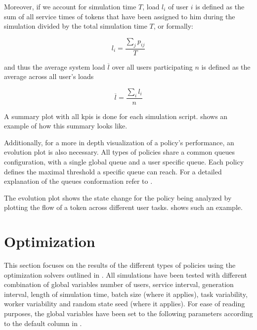 \documentclass{seal_thesis}
\begin{document}
Moreover, if we account for simulation time $T$, load $l_i$ of user $i$ is defined as the sum of all service times of tokens that have been assigned to him during the simulation divided by the total simulation time $T$, or formally:

\begin{equation}
	l_i=\frac{\sum_j p_{ij}}{T}
\end{equation}

and thus the average system load $\overline{l}$ over all users participating $n$ is defined as the average across all user's loads \ie

\begin{equation}
	\overline{l} = \frac{\sum_i l_i}{n}
\end{equation}

A summary plot with all \glspl{kpi} is done for each simulation script.  shows an example of how this summary looks like.


Additionally, for a more in depth visualization of a policy's performance, an evolution plot is also necessary. All types of policies share a common queues configuration, with a single global queue and a user specific queue. Each policy defines the maximal threshold a specific queue can reach. For a detailed explanation of the queues conformation refer to .

The evolution plot shows the state change for the policy being analyzed by plotting the flow of a token across different user tasks.  shows such an example.


\clearpage

\section{Optimization}
\label{sec:op_results}

This section focuses on the results of the different types of policies using the optimization solvers outlined in . All simulations have been tested with different combination of global variables \ie number of users, service interval, generation interval, length of simulation time, batch size (where it applies), task variability, worker variability and random state seed (where it applies). For ease of reading purposes, the global variables have been set to the following parameters according to the default column in .
\end{document}
